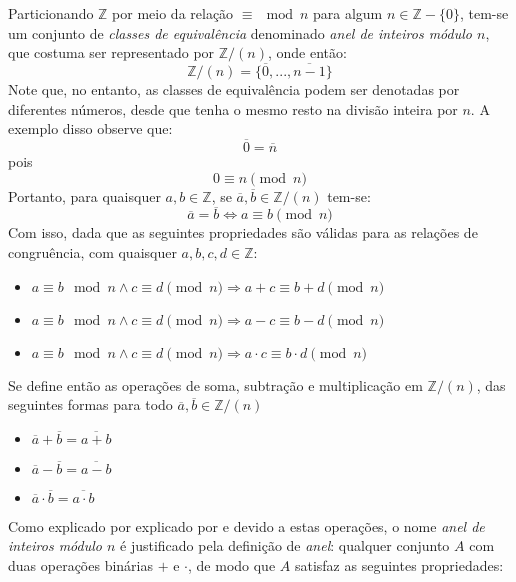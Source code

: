 Particionando $\mathbb{Z}$ por meio da relação $\equiv \mod n$ para algum $n \in \mathbb{Z} - \{0\}$, tem-se um conjunto de \textit{classes de equivalência} denominado \textit{anel de inteiros módulo $n$}, que costuma ser representado por $\mathbb{Z}/(n)$, onde então:
\begin{equation*}
    \mathbb{Z}/(n) = \{\overline{0}, ..., \overline{n - 1}\}
\end{equation*}
Note que, no entanto, as classes de equivalência podem ser denotadas por diferentes números, desde que tenha o mesmo resto na divisão inteira por $n$. A exemplo disso observe que:
\begin{equation*}
    \overline{0} = \overline{n}
\end{equation*}
pois
\begin{equation}
    0 \equiv n \pmod{n}
\end{equation}
Portanto, para quaisquer $a, b \in \mathbb{Z}$, se $\overline{a}, \overline{b} \in \mathbb{Z}/(n)$ tem-se:
\begin{equation*}
    \overline{a} = \overline{b} \Longleftrightarrow a \equiv b \pmod{n}
\end{equation*}
Com isso, dada que as seguintes propriedades são válidas para as relações de congruência, com quaisquer $a, b, c, d \in \mathbb{Z}$:
\begin{itemize}
    \item $a \equiv b \mod n \land c \equiv d \pmod{n} \Rightarrow a + c \equiv b + d \pmod{n}$
    \item $a \equiv b \mod n \land c \equiv d \pmod{n} \Rightarrow a - c \equiv b - d \pmod{n}$
    \item $a \equiv b \mod n \land c \equiv d \pmod{n} \Rightarrow a \cdot c \equiv b \cdot d \pmod{n}$
\end{itemize}
Se define então as operações de soma, subtração e multiplicação em $\mathbb{Z}/(n)$, das seguintes formas para todo $\overline{a}, \overline{b} \in \mathbb{Z}/(n)$
\begin{itemize}
    \item $\overline{a} + \overline{b} = \overline{a + b}$
    \item $\overline{a} - \overline{b} = \overline{a - b}$
    \item $\overline{a} \cdot \overline{b} = \overline{a \cdot b}$
\end{itemize}
Como explicado por explicado por \cite{book:2399854} e devido a estas operações, o nome \textit{anel de inteiros módulo $n$} é justificado pela definição de \textit{anel}: qualquer conjunto $A$ com duas operações binárias $+$ e $\cdot$, de modo que $A$ satisfaz as seguintes propriedades:

